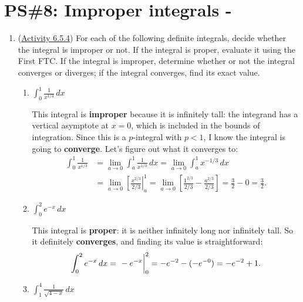 


%


\allowdisplaybreaks
\section{PS\#8: Improper integrals -  }

\everymath{\displaystyle}
\begin{enumerate}[leftmargin=0pt]

\item (\href{https://activecalculus.org/single/sec-6-5-improper.html#IZN}{Activity 6.5.4}) For each of the following definite integrals, decide whether the integral is improper or not. If the integral is proper, evaluate it using the First FTC. If the integral is improper, determine whether or not the integral converges or diverges; if the integral converges, find its exact value.
\begin{enumerate}
    \item $\displaystyle \int_0^1 \frac{1}{x^{1/3}} \, dx$
    
    \begin{red}
    This integral is \textbf{improper} because it is infinitely tall: the integrand has a vertical asymptote at $x=0$, which is included in the bounds of integration. Since this is a $p$-integral with $p < 1$, I know the integral is going to \textbf{converge}. Let's figure out what it converges to:
    \begin{align*}
        \int_0^1 \frac{1}{x^{1/3}} &= 
        \lim_{a\to 0}\int_a^1 \frac1{x^{1/3}}\, dx =
        \lim_{a\to 0}\int_a^1 x^{-1/3}\, dx \\
        &= \lim_{a\to 0} \left[ \frac{x^{2/3}}{2/3} \right|_a^1 
        = \lim_{a\to 0}\left[\frac{1^{2/3}}{2/3} - \frac{a^{2/3}}{2/3}\right] = \frac{3}{2} - 0 = \frac{3}{2}.
    \end{align*}
    \end{red}
    \item $\displaystyle \int_0^2 e^{-x} \, dx$
    
    \begin{red}
    This integral is \textbf{proper}: it is neither infinitely long nor infinitely tall. So it definitely \textbf{converges}, and finding its value is straightforward:
    \[\int_0^2 e^{-x} \, dx = \left.\vphantom{\int} -e^{-x}\right|_0^2 = -e^{-2} - (-e^{-0}) = -e^{-2}+1.\]
    \end{red}
    \item $\displaystyle \int_1^4 \frac{1}{\sqrt{4-x}} \, dx$
    

\end{enumerate}
\end{enumerate}
